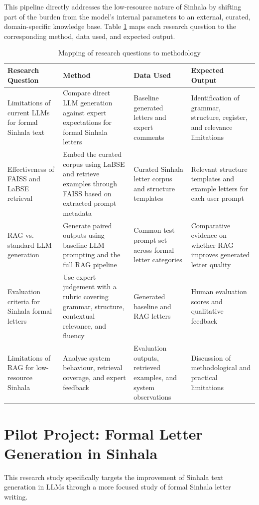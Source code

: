 \documentclass[12pt]{uomthesis}
\begin{document}
This pipeline directly addresses the low-resource nature of Sinhala by shifting part of the burden from the model's internal parameters to an external, curated, domain-specific knowledge base. Table \ref{tab:rq_methodology_mapping} maps each research question to the corresponding method, data used, and expected output.

\begin{table}[h!]
\centering
\small
\begin{tabularx}{\linewidth}{@{}p{3.4cm}Xp{3.2cm}p{3.3cm}@{}}
\toprule
\textbf{Research Question} & \textbf{Method} & \textbf{Data Used} & \textbf{Expected Output} \\
\midrule
Limitations of current LLMs for formal Sinhala text & Compare direct LLM generation against expert expectations for formal Sinhala letters & Baseline generated letters and expert comments & Identification of grammar, structure, register, and relevance limitations \\
\addlinespace
Effectiveness of FAISS and LaBSE retrieval & Embed the curated corpus using LaBSE and retrieve examples through FAISS based on extracted prompt metadata & Curated Sinhala letter corpus and structure templates & Relevant structure templates and example letters for each user prompt \\
\addlinespace
RAG vs. standard LLM generation & Generate paired outputs using baseline LLM prompting and the full RAG pipeline & Common test prompt set across formal letter categories & Comparative evidence on whether RAG improves generated letter quality \\
\addlinespace
Evaluation criteria for Sinhala formal letters & Use expert judgement with a rubric covering grammar, structure, contextual relevance, and fluency & Generated baseline and RAG letters & Human evaluation scores and qualitative feedback \\
\addlinespace
Limitations of RAG for low-resource Sinhala & Analyse system behaviour, retrieval coverage, and expert feedback & Evaluation outputs, retrieved examples, and system observations & Discussion of methodological and practical limitations \\
\bottomrule
\end{tabularx}
\caption{Mapping of research questions to methodology}
\label{tab:rq_methodology_mapping}
\end{table}

\section{Pilot Project: Formal Letter Generation in Sinhala}
This research study specifically targets the improvement of Sinhala text generation in LLMs through a more focused study of formal Sinhala letter writing.
\end{document}
